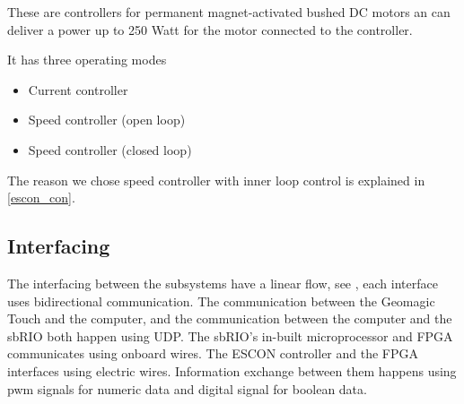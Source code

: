 These are controllers for permanent magnet-activated bushed DC motors an can deliver a power up to 250 Watt for the motor connected to the controller. 

It has three operating modes

\begin{itemize}
\item Current controller
\item Speed controller (open loop)
\item Speed controller (closed loop)
\end{itemize}

The reason we chose speed controller with inner loop control is explained in \ref{escon_con}.

\subsection{Interfacing}

The interfacing between the subsystems have a linear flow, see , each interface uses bidirectional communication. The communication between the Geomagic Touch and the computer, and the communication between the computer and the sbRIO both happen using UDP. The sbRIO's in-built microprocessor and FPGA communicates using onboard wires. The ESCON controller and the FPGA interfaces using electric wires. Information exchange between them happens using pwm signals for numeric data and digital signal for boolean data.

%

